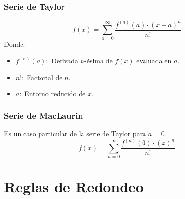\subsubsection{Serie de Taylor}
$$f(x)=\displaystyle\sum_{n=0}^{\infty} \dfrac{ f^{(n)}(a) \cdot (x-a)^n}{n!} $$
Donde:
\begin{itemize}
\item $f^{(n)}(a):$ Derivada $n$-ésima de $f(x)$ evaluada en $a$.
\item $n!:$ Factorial de $n$.
\item $a:$ Entorno reducido de $x$.
\end{itemize}
\subsubsection{Serie de MacLaurin}
Es un caso particular de la serie de Taylor para $a=0$.
$$f(x)=\displaystyle\sum_{n=0}^{\infty} \dfrac{ f^{(n)}(0) \cdot (x)^n}{n!} $$
\section{Reglas de Redondeo}